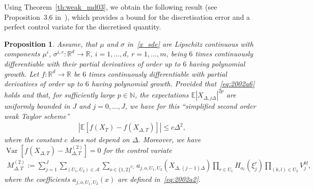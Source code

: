 \documentclass[11pt,a4paper]{amsart}
\theoremstyle{plain}
\newtheorem{proposition}[theorem]{Proposition}
\theoremstyle{definition}
\theoremstyle{remark}
\numberwithin{equation}{section}
\newcommand*{\E}{\mathbb{E}}
\newcommand*{\R}{\mathbb{R}}
\newcommand*{\Var}{\operatorname{Var}}
\newcommand*{\EE}{\mathbb E}
\newcommand*{\cA}{\mathcal A}
\renewcommand*{\doteq}{:=}
\begin{document}
Using Theorem~\ref{th:weak_md03},
we obtain the following result (see Proposition~3.6 in~\cite{belomestny2016variance}),
which provides a bound for the discretisation error
and a perfect control variate for the discretised quantity.

\begin{proposition}
\label{prop:second:CV}
Assume, that $\mu$ and $\sigma$ in~\eqref{x_sde} are Lipschitz continuous with components
$\mu^i,\,\sigma^{i,r}\colon \R^d\to\R$,
$i=1,\ldots,d$, $r=1,\ldots,m$,
being $6$ times continuously differentiable
with their partial derivatives of order up to $6$
having polynomial growth.
Let $f\colon\R^d\to\R$ be $6$ times continuously differentiable
with partial derivatives of order up to $6$
having polynomial growth.
Provided that~\eqref{eq:2002a6} holds
and that, for sufficiently large $p\in\mathbb N$,
the expectations $\EE |X_{\Delta,j\Delta}|^{2p}$
are uniformly bounded in $J$ and $j=0,\ldots,J$,
we have for this
``simplified second order weak Taylor scheme''
\begin{align*}
\left|\E\left[f(X_T) - f(X_{\Delta,T})\right]\right|\le c\Delta^2,
\end{align*}
where the constant $c$ does not depend on $\Delta$. Moreover, we have
$\Var\left[f(X_{\Delta,T}) - M^{(2)}_{\Delta,T}\right]=0$
for the control variate
\begin{align}
\label{eq:28042016a1}
M^{(2)}_{\Delta,T}\doteq\sum_{j=1}^J
\sum_{(U_1,U_2)\in\cA}
\sum_{o\in\{1,2\}^{U_1}}
a_{j,o,U_1,U_2}(X_{\Delta,(j-1)\Delta})
\prod_{r\in U_1} H_{o_r}(\xi_j^r)
\prod_{(k,l)\in U_2} V_j^{kl},
\end{align}
where the coefficients
$a_{j,o,U_1,U_2}(x)$ are defined in~\eqref{eq:2002a2}.
\end{proposition}
\end{document}
